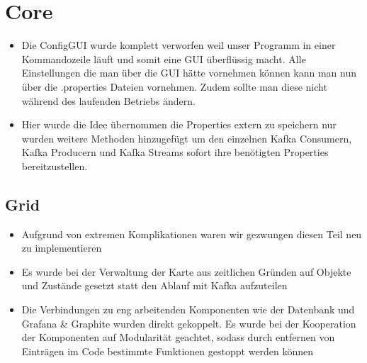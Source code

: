 \section{Core}
\begin{itemize}
	\item Die ConfigGUI wurde komplett verworfen weil unser Programm in einer Kommandozeile läuft und somit eine GUI überflüssig macht. Alle Einstellungen die man über die GUI hätte vornehmen können kann man nun über die .properties Dateien vornehmen. Zudem sollte man diese nicht während des laufenden Betriebs ändern.
	\item Hier wurde die Idee übernommen die Properties extern zu speichern nur wurden weitere Methoden hinzugefügt um den einzelnen Kafka Consumern, Kafka Producern und Kafka Streams sofort ihre benötigten Properties bereitzustellen.
\end{itemize}
\subsection{Grid}
\begin{itemize}
	\item Aufgrund von extremen Komplikationen waren wir gezwungen diesen Teil neu zu implementieren
	\item Es wurde bei der Verwaltung der Karte aus zeitlichen Gründen auf Objekte und Zustände gesetzt statt den Ablauf mit Kafka aufzuteilen
	\item Die Verbindungen zu eng arbeitenden Komponenten wie der Datenbank und Grafana \& Graphite wurden direkt gekoppelt. Es wurde bei der Kooperation der Komponenten auf Modularität geachtet, sodass durch entfernen von Einträgen im Code bestimmte Funktionen gestoppt werden können
\end{itemize}
